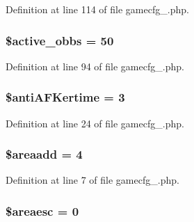 Definition at line 114 of file gamecfg\+\_.\+php.

\hypertarget{gamecfg__1_8php_a8f4d34dce8ae1c6ac3012aab072d135d}{
\subsubsection[{\$active\+\_\+obbs}]{\setlength{\rightskip}{0pt plus 5cm}\$active\+\_\+obbs = 50}}\label{gamecfg__1_8php_a8f4d34dce8ae1c6ac3012aab072d135d}


Definition at line 94 of file gamecfg\+\_.\+php.

\hypertarget{gamecfg__1_8php_a87efbe85ad8248889a2017c77c47d518}{
\subsubsection[{\$anti\+A\+F\+Kertime}]{\setlength{\rightskip}{0pt plus 5cm}\$anti\+A\+F\+Kertime = 3}}\label{gamecfg__1_8php_a87efbe85ad8248889a2017c77c47d518}


Definition at line 24 of file gamecfg\+\_.\+php.

\hypertarget{gamecfg__1_8php_af943e9b276a7ecbe26aad99a4e0096b9}{
\subsubsection[{\$areaadd}]{\setlength{\rightskip}{0pt plus 5cm}\$areaadd = 4}}\label{gamecfg__1_8php_af943e9b276a7ecbe26aad99a4e0096b9}


Definition at line 7 of file gamecfg\+\_.\+php.

\hypertarget{gamecfg__1_8php_aeadef6322f6931fcfe9d86637a36466f}{
\subsubsection[{\$areaesc}]{\setlength{\rightskip}{0pt plus 5cm}\$areaesc = 0}}\label{gamecfg__1_8php_aeadef6322f6931fcfe9d86637a36466f}


